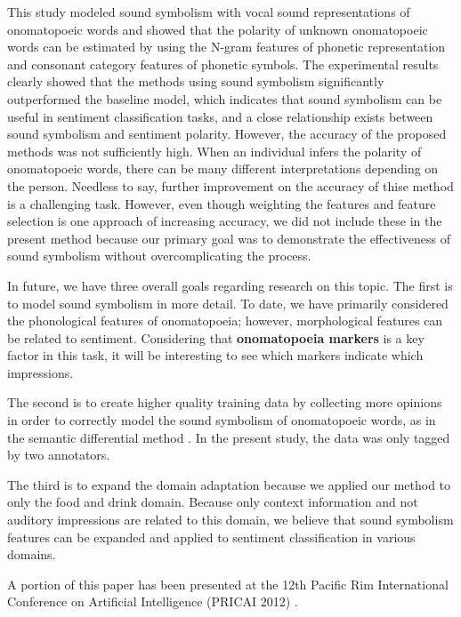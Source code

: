 \documentclass[english]{jnlp_1.4}
\begin{document}
This study modeled sound symbolism with vocal sound representations of onomatopoeic words and
showed that the polarity of unknown onomatopoeic words can be estimated by using the N-gram features of phonetic representation and consonant category features of phonetic symbols.
The experimental results clearly showed that the methods using sound symbolism significantly outperformed the baseline model,
which indicates that sound symbolism can be useful in sentiment classification tasks, and a close relationship exists between sound symbolism and sentiment polarity.
However, the accuracy of the proposed methods was not sufficiently high.
When an individual infers the polarity of onomatopoeic words, there can be many different interpretations depending on the person.
Needless to say, further improvement on the accuracy of thise method is a challenging task.
However, even though weighting the features and feature selection is one approach of increasing accuracy,
we did not include these in the present method because our primary goal was to demonstrate the effectiveness of sound symbolism without overcomplicating the process.

In future, we have three overall goals regarding research on this topic.
The first is to model sound symbolism in more detail.
To date, we have primarily considered the phonological features of onomatopoeia; however, morphological features can be related to sentiment.
Considering that {\bf onomatopoeia markers} is a key factor in this task,
it will be interesting to see which markers indicate which impressions.

The second is to create higher quality training data by collecting more opinions in order to correctly model the sound symbolism of onomatopoeic words, as in the semantic differential method \cite{osgood1957}.
In the present study, the data was only tagged by two annotators.

The third is to expand the domain adaptation because we applied our method to only the food and drink domain.
Because only context information and not auditory impressions are related to this domain, we believe that sound symbolism features can be expanded and applied to sentiment classification in various domains.


\acknowledgment

A portion of this paper has been presented at the 12th Pacific Rim International Conference on Artificial Intelligence (PRICAI 2012) \cite{Igarashi2012}.
\end{document}
